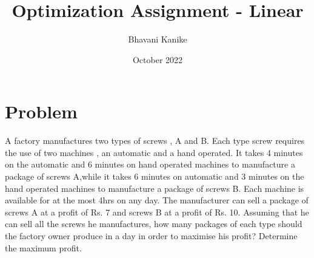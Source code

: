 \documentclass[journal,10pt]{article}
\title{\textbf{Optimization Assignment - Linear}}
\author{Bhavani Kanike}
\date{October 2022}
\begin{document}
\maketitle


\section*{Problem}
\fi
A factory manufactures two types of screws , A and B. Each type screw requires the use of two machines , an automatic and a hand operated. It takes 4 minutes on the automatic and 6 minutes on hand operated machines to manufacture a package of screws A,while it takes 6 minutes on automatic and 3 minutes on the hand operated machines to manufacture a package of screws B. Each machine is available for at the most 4hrs on any day. The manufacturer can sell a package of screws A at a profit of Rs. 7 and screws B at a profit of Rs. 10. Assuming that he can sell all the screws he manufactures, how many packages of each type should the factory owner produce in a day in order to maximise his profit? Determine the maximum profit.
\\
\solution
\iffalse
\end{document}
